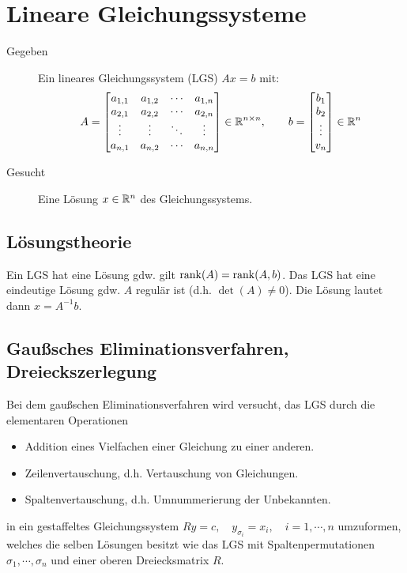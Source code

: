 	\chapter{Lineare Gleichungssysteme}
		\begin{description}
			\item[Gegeben] Ein lineares Gleichungssystem (LGS) \( Ax = b \) mit:
				\begin{equation*}
					A =
					\begin{bmatrix}
						a_{1,1} & a_{1,2} & \cdots & a_{1,n} \\
						a_{2,1} & a_{2,2} & \cdots & a_{2,n} \\
						\vdots  & \vdots  & \ddots & \vdots  \\
						a_{n,1} & a_{n,2} & \cdots & a_{n,n}
					\end{bmatrix}
					\in \mathbb{R}^{n \times n}, \qquad
					b =
					\begin{bmatrix}
						b_1    \\
						b_2    \\
						\vdots \\
						v_n
					\end{bmatrix}
					\in \mathbb{R}^n
				\end{equation*}
			\item[Gesucht] Eine Lösung \( x \in \mathbb{R}^n \) des Gleichungssystems.
		\end{description}

		\section{Lösungstheorie}
			Ein LGS hat eine Lösung gdw. gilt \( \rank(A) = \rank(A, b) \). Das LGS hat eine eindeutige Lösung gdw. \(A\) regulär ist (d.h. \( \det(A) \neq 0 \)). Die Lösung lautet dann \( x = A^{-1} b \).

		\section{Gaußsches Eliminationsverfahren, Dreieckszerlegung}
			Bei dem gaußschen Eliminationsverfahren wird versucht, das LGS durch die elementaren Operationen
			\begin{itemize}
				\item Addition eines Vielfachen einer Gleichung zu einer anderen.
				\item Zeilenvertauschung, d.h. Vertauschung von Gleichungen.
				\item Spaltenvertauschung, d.h. Umnummerierung der Unbekannten.
			\end{itemize}
			in ein gestaffeltes Gleichungssystem \( Ry = c, \quad y_{\sigma_i} = x_i, \quad i = 1, \cdots, n \) umzuformen, welches die selben Lösungen besitzt wie das LGS mit Spaltenpermutationen \( \sigma_1, \cdots, \sigma_n \) und einer oberen Dreiecksmatrix \(R\).

